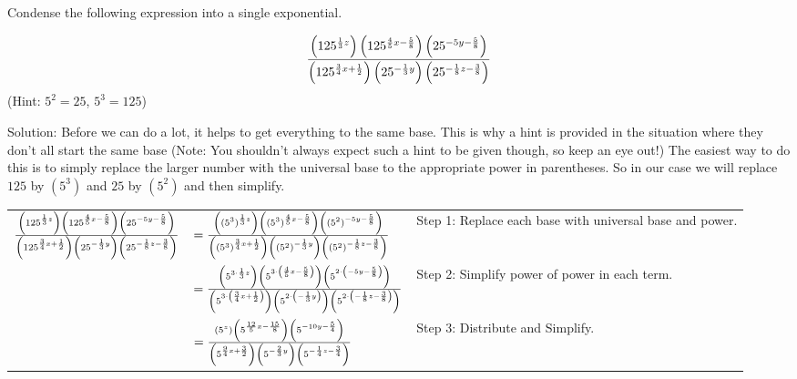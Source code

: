 \documentclass{ximera}
\begin{document}
\begin{example}
Condense the following expression into a single exponential.

\[
    \frac{%
        \left(125^{\frac{1}{3}z}\right)\left(125^{\frac{4}{5}x-\frac{5}{8}}\right)\left(25^{-5y-\frac{5}{8}}\right)
        }%
        {
        \left(125^{\frac{3}{4}x+\frac{1}{2}}\right)\left(25^{-\frac{1}{3}y}\right)\left(25^{-\frac{1}{8}z-\frac{3}{8}}\right)
        }
\]
(Hint: $5^2= 25$, $5^3 = 125$)

 
Solution: Before we can do a lot, it helps to get everything to the same base. This is why a hint is provided in the situation where they don't all start the same base (Note: You shouldn't always expect such a hint to be given though, so keep an eye out!) The easiest way to do this is to simply replace the larger number with the universal base to the appropriate power in parentheses. So in our case we will replace $125$ by $(5^3)$ and $25$ by $(5^2)$ and then simplify.

\noindent\begin{tabular}{rll}
    $\frac{%
        \left(125^{\frac{1}{3}z}\right)\left(125^{\frac{4}{5}x-\frac{5}{8}}\right)\left(25^{-5y-\frac{5}{8}}\right)
        }%
        {
        \left(125^{\frac{3}{4}x+\frac{1}{2}}\right)\left(25^{-\frac{1}{3}y}\right)\left(25^{-\frac{1}{8}z-\frac{3}{8}}\right)
        }$
    & $=\frac{%
        \left((5^3)^{\frac{1}{3}z}\right)\left((5^3)^{\frac{4}{5}x-\frac{5}{8}}\right)\left((5^2)^{-5y-\frac{5}{8}}\right)
        }%
        {
        \left((5^3)^{\frac{3}{4}x+\frac{1}{2}}\right)\left((5^2)^{-\frac{1}{3}y}\right)\left((5^2)^{-\frac{1}{8}z-\frac{3}{8}}\right)
        }$
    & Step 1: Replace each base with universal base and power.\\
    & $=\frac{%
        \left(5^{3\cdot\frac{1}{3}z}\right)\left(5^{3\cdot\left(\frac{4}{5}x-\frac{5}{8}\right)}\right)\left(5^{2\cdot\left(-5y-\frac{5}{8}\right)}\right)
        }%
        {
        \left(5^{3\cdot\left(\frac{3}{4}x+\frac{1}{2}\right)}\right)\left(5^{2\cdot\left(-\frac{1}{3}y\right)}\right)\left(5^{2\cdot\left(-\frac{1}{8}z-\frac{3}{8}\right)}\right)
        }$
    & Step 2: Simplify power of power in each term.\\
    & $=\frac{%
        \left(5^{z}\right)\left(5^{\frac{12}{5}x-\frac{15}{8}}\right)\left(5^{-10y-\frac{5}{4}}\right)
        }%
        {
        \left(5^{\frac{9}{4}x+\frac{3}{2}}\right)\left(5^{-\frac{2}{3}y}\right)\left(5^{-\frac{1}{4}z-\frac{3}{4}}\right)
        }$
    & Step 3: Distribute and Simplify.\\     
\end{tabular}


\end{example}
\end{document}
